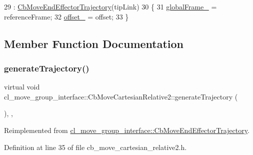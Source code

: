 \begin{DoxyCode}
29             : \hyperlink{classcl__move__group__interface_1_1CbMoveEndEffectorTrajectory_af7e718b0c53e912fd74968abbb0a4810}{CbMoveEndEffectorTrajectory}(tipLink)
30         \{
31             \hyperlink{classcl__move__group__interface_1_1CbMoveCartesianRelative2_ac33f1b3f077e191cda9b0b5f9f8c1f34}{globalFrame\_} = referenceFrame;
32             \hyperlink{classcl__move__group__interface_1_1CbMoveCartesianRelative2_a38e3c82a5fac0028a1d74eba4e478181}{offset\_} = offset;
33         \}
\end{DoxyCode}


\subsection{Member Function Documentation}
\mbox{\label{classcl__move__group__interface_1_1CbMoveCartesianRelative2_a6ba51647d197e874a87289a90ff8e0f1}} 
\subsubsection{\texorpdfstring{generate\+Trajectory()}{generateTrajectory()}}
{\footnotesize\ttfamily virtual void cl\+\_\+move\+\_\+group\+\_\+interface\+::\+Cb\+Move\+Cartesian\+Relative2\+::generate\+Trajectory (\begin{DoxyParamCaption}{ }\end{DoxyParamCaption})\hspace{0.3cm}{\ttfamily [inline]}, {\ttfamily [override]}, {\ttfamily [virtual]}}



Reimplemented from \hyperlink{classcl__move__group__interface_1_1CbMoveEndEffectorTrajectory_aeae938ab66e18ab7d2fb2427bc83647b}{cl\+\_\+move\+\_\+group\+\_\+interface\+::\+Cb\+Move\+End\+Effector\+Trajectory}.



Definition at line 35 of file cb\+\_\+move\+\_\+cartesian\+\_\+relative2.\+h.



